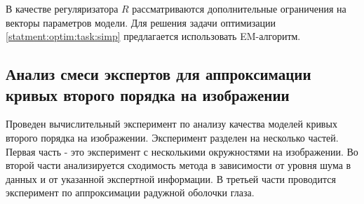 В качестве регуляризатора $R$ рассматриваются дополнительные ограничения на векторы параметров модели. Для решения задачи оптимизации \eqref{statment:optim:task:simp} предлагается использовать EM-алгоритм.

\subsection{Анализ смеси экспертов для аппроксимации кривых второго порядка на изображении}
\label{sec:5}

Проведен вычислительный эксперимент по анализу качества моделей кривых второго порядка на изображении. Эксперимент разделен на несколько частей. Первая часть - это эксперимент с несколькими окружностями на изображении. Во второй части анализируется сходимость метода в зависимости от уровня шума в данных и от указанной экспертной информации. В третьей части проводится эксперимент по аппроксимации радужной оболочки глаза.

